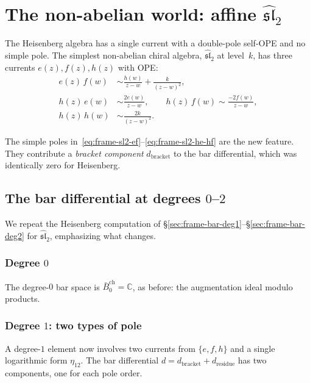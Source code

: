 \section{\texorpdfstring{The non-abelian world: affine $\widehat{\mathfrak{sl}}_2$}{The non-abelian world: affine sl2}}
\label{sec:frame-nonabelian-preview}

The Heisenberg algebra has a single current with a double-pole
self-OPE and no simple pole. The simplest non-abelian chiral
algebra, $\widehat{\mathfrak{sl}}_2$ at level~$k$, has three
currents $e(z), f(z), h(z)$ with OPE:
\begin{align}
e(z)\, f(w) &\sim \frac{h(w)}{z-w}
 + \frac{k}{(z-w)^2}, \label{eq:frame-sl2-ef} \\
h(z)\, e(w) &\sim \frac{2e(w)}{z-w}, \qquad
h(z)\, f(w) \sim \frac{-2f(w)}{z-w},
 \label{eq:frame-sl2-he-hf} \\
h(z)\, h(w) &\sim \frac{2k}{(z-w)^2}.
 \label{eq:frame-sl2-hh}
\end{align}

The simple poles in~\eqref{eq:frame-sl2-ef}--\eqref{eq:frame-sl2-he-hf}
are the new feature. They contribute a
\emph{bracket component} $d_{\mathrm{bracket}}$ to the bar
differential, which was identically zero for Heisenberg.

\subsection{\texorpdfstring{The bar differential at degrees $0$--$2$}{The bar differential at degrees 0--2}}
\label{subsec:frame-sl2-bar-low-degree}

We repeat the Heisenberg computation of \S\ref{sec:frame-bar-deg1}--\S\ref{sec:frame-bar-deg2} for $\widehat{\mathfrak{sl}}_2$, emphasizing what changes.

\subsubsection*{Degree $0$}
The degree-$0$ bar space is $\bar{B}_0^{\mathrm{ch}} = \mathbb{C}$,
as before: the augmentation ideal modulo products.

\subsubsection*{Degree $1$: two types of pole}
A degree-$1$ element now involves two currents from $\{e, f, h\}$
and a single logarithmic form $\eta_{12}$. The bar differential
$d = d_{\mathrm{bracket}} + d_{\mathrm{residue}}$ has two
components, one for each pole order.


